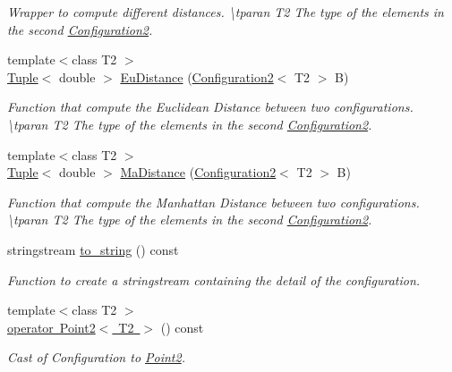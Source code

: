 \begin{DoxyCompactItemize}
\begin{DoxyCompactList}\small\item\em Wrapper to compute different distances. \textbackslash{}tparan T2 The type of the elements in the second {\ttfamily \mbox{\hyperlink{class_configuration2}{Configuration2}}}. \end{DoxyCompactList}\item 
{\footnotesize template$<$class T2 $>$ }\\\mbox{\hyperlink{class_tuple}{Tuple}}$<$ double $>$ \mbox{\hyperlink{class_configuration2_aae3e1b7e718b227b6fa65db67ab2b8eb}{Eu\+Distance}} (\mbox{\hyperlink{class_configuration2}{Configuration2}}$<$ T2 $>$ B)
\begin{DoxyCompactList}\small\item\em Function that compute the Euclidean Distance between two configurations. \textbackslash{}tparan T2 The type of the elements in the second {\ttfamily \mbox{\hyperlink{class_configuration2}{Configuration2}}}. \end{DoxyCompactList}\item 
{\footnotesize template$<$class T2 $>$ }\\\mbox{\hyperlink{class_tuple}{Tuple}}$<$ double $>$ \mbox{\hyperlink{class_configuration2_afb287896fc721e64bc50425795a84a77}{Ma\+Distance}} (\mbox{\hyperlink{class_configuration2}{Configuration2}}$<$ T2 $>$ B)
\begin{DoxyCompactList}\small\item\em Function that compute the Manhattan Distance between two configurations. \textbackslash{}tparan T2 The type of the elements in the second {\ttfamily \mbox{\hyperlink{class_configuration2}{Configuration2}}}. \end{DoxyCompactList}\item 
stringstream \mbox{\hyperlink{class_configuration2_ac68ba3be6be597763a5caa4bd7efa3d8}{to\+\_\+string}} () const
\begin{DoxyCompactList}\small\item\em Function to create a stringstream containing the detail of the configuration. \end{DoxyCompactList}\item 
{\footnotesize template$<$class T2 $>$ }\\\mbox{\hyperlink{class_configuration2_a68bfa8b94c1cff3179698e00edb2890e}{operator Point2$<$ T2 $>$}} () const
\begin{DoxyCompactList}\small\item\em Cast of Configuration to \mbox{\hyperlink{class_point2}{Point2}}. \end{DoxyCompactList}\item 

\end{DoxyCompactItemize}
